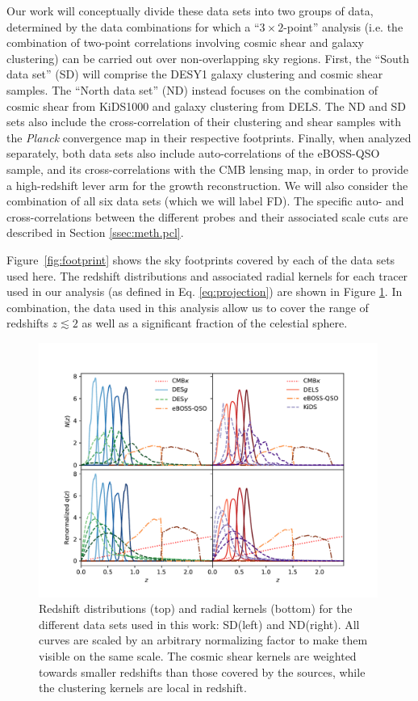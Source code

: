\documentclass[a4paper,11pt]{article}
\newcommand{\planck}{{\sl Planck}\xspace}
\newcommand{\dls}{DELS\xspace}
\newcommand{\northd}{ND\xspace}
\newcommand{\southd}{SD\xspace}
\newcommand{\alld}{FD\xspace}
\begin{document}
    Our work will conceptually divide these data sets into two groups of data, determined by the data combinations for which a ``$3\times2$-point'' analysis (i.e. the combination of two-point correlations involving cosmic shear and galaxy clustering) can be carried out over non-overlapping sky regions. First, the ``South data set'' (\southd) will comprise the DESY1 galaxy clustering and cosmic shear samples. The ``North data set'' (\northd) instead focuses on the combination of cosmic shear from KiDS1000 and galaxy clustering from \dls. The \northd and \southd sets also include the cross-correlation of their clustering and shear samples with the \planck convergence map in their respective footprints. Finally, when analyzed separately, both data sets also include auto-correlations of the eBOSS-QSO sample, and its cross-correlations with the CMB lensing map, in order to provide a high-redshift lever arm for the growth reconstruction. We will also consider the combination of all six data sets (which we will label \alld). The specific auto- and cross-correlations between the different probes and their associated scale cuts are described in Section \ref{ssec:meth.pcl}.

    Figure~\ref{fig:footprint} shows the sky footprints covered by each of the data sets used here. The redshift distributions and associated radial kernels for each tracer used in our analysis (as defined in Eq. \ref{eq:projection}) are shown in Figure \ref{fig:zbins}. In combination, the data used in this analysis allow us to cover the range of redshifts $z\lesssim2$ as well as a significant fraction of the celestial sphere.
    \begin{figure}
      \centering
      \includegraphics[width=0.99\textwidth]{figures/Nz.pdf}
      \caption{Redshift distributions (top) and radial kernels (bottom) for the different data sets used in this work: \southd (left) and \northd (right). All curves are scaled by an arbitrary normalizing factor to make them visible on the same scale. The cosmic shear kernels are weighted towards smaller redshifts than those covered by the sources, while the clustering kernels are local in redshift.}\label{fig:zbins}
    \end{figure}
\end{document}
